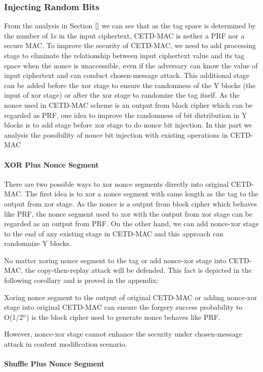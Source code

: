  \subsubsection{Injecting Random Bits}
 From the analysis in Section $\ref{}$ we can see that as the tag space is determined by the number of 1s in the input ciphertext, CETD-MAC is nether a PRF nor a secure MAC. To improve the security of CETD-MAC, we need to add processing stage to eliminate the relationship between input ciphertext value and its tag space when the nonce is unaccessible, even if the adversary can know the value of input ciphertext and can conduct chosen-message attack. This additional stage can be added before the xor stage to ensure the randomness of the Y blocks (the input of xor stage) or after the xor stage to randomize the tag itself.
As the nonce used in CETD-MAC scheme is an output from block cipher which can be regarded as PRF, one idea to improve the randomness of bit distribution in Y blocks is to add stage before xor stage to do nonce bit injection. In this part we analysis the possibility of nonce bit injection with existing operations in CETD-MAC
 \paragraph{XOR Plus Nonce Segment}
There are two possible ways to xor nonce segments directly into original CETD-MAC. The first idea is to xor a nonce segment with same length as the tag to the output from xor stage. As the nonce is a output from block cipher which behaves like PRF, the nonce segment used to xor with the output from xor stage can be regarded as an output from PRF. On the other hand, we can add nonce-xor stage to the end of any existing stage in CETD-MAC and this approach can randomnize Y blocks. 

No matter xoring nonce segment to the tag or add nonce-xor stage into CETD-MAC, the copy-then-replay attack will be defended. This fact is depicted in the following corollary and is proved in the appendix:
\begin{corollary}
Xoring nonce segment to the output of original CETD-MAC or adding nonce-xor stage into original CETD-MAC can ensure the forgery success probability to O(1/2$^n$) is the block cipher used to generate nonce behaves like PRF.
\end{corollary}

However, nonce-xor stage cannot enhance the security under chosen-message attack in content modification scenario. 
 \paragraph{Shuffle Plus Nonce Segment}


